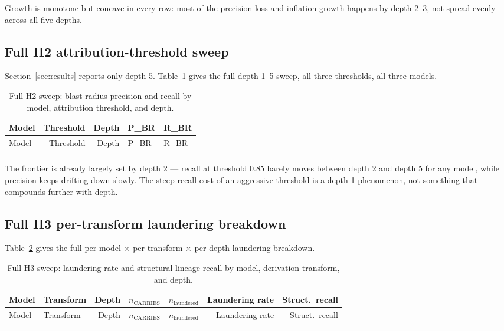 Growth is monotone but concave in every row: most of the precision loss
and inflation growth happens by depth 2--3, not spread evenly across
all five depths.

\subsection{Full H2 attribution-threshold sweep}

Section~\ref{sec:results} reports only depth 5. Table~\ref{tab:appendix-h2}
gives the full depth 1--5 sweep, all three thresholds, all three models.

\begin{longtable}{@{}lrrll@{}}
\caption{Full H2 sweep: blast-radius precision and recall by model, attribution threshold, and depth.}
\label{tab:appendix-h2} \\
\toprule
Model & Threshold & Depth & P\_BR & R\_BR \\
\midrule
\endfirsthead
\toprule
Model & Threshold & Depth & P\_BR & R\_BR \\
\midrule
\endhead
\bottomrule
\endfoot

\end{longtable}

The frontier is already largely set by depth 2 --- recall at threshold
0.85 barely moves between depth 2 and depth 5 for any model, while
precision keeps drifting down slowly. The steep recall cost of an
aggressive threshold is a depth-1 phenomenon, not something that
compounds further with depth.

\subsection{Full H3 per-transform laundering breakdown}

Table~\ref{tab:appendix-h3} gives the full per-model $\times$
per-transform $\times$ per-depth laundering breakdown.

\begin{longtable}{@{}llrrrrr@{}}
\caption{Full H3 sweep: laundering rate and structural-lineage recall by model, derivation transform, and depth.}
\label{tab:appendix-h3} \\
\toprule
Model & Transform & Depth & $n_{\text{CARRIES}}$ & $n_{\text{laundered}}$ & Laundering rate & Struct.\ recall \\
\midrule
\endfirsthead
\toprule
Model & Transform & Depth & $n_{\text{CARRIES}}$ & $n_{\text{laundered}}$ & Laundering rate & Struct.\ recall \\
\midrule
\endhead
\bottomrule
\endfoot

\end{longtable}

